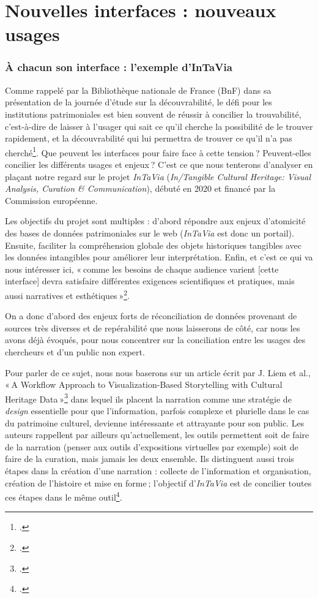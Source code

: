 \chapter{Nouvelles interfaces : nouveaux usages}

\subsection{À chacun son interface : l'exemple d'InTaVia}

Comme rappelé par la Bibliothèque nationale de France (BnF) dans sa présentation de la journée d’étude sur la découvrabilité, le défi pour les institutions patrimoniales est bien souvent de réussir à concilier la trouvabilité, c’est-à-dire de laisser à l’usager qui sait ce qu’il cherche la possibilité de le trouver rapidement, et la découvrabilité qui lui permettra de trouver ce qu’il n’a pas cherché\footcite{2023e}. Que peuvent les interfaces pour faire face à cette tension ? Peuvent-elles concilier les différents usages et enjeux ? C’est ce que nous tenterons d’analyser en plaçant notre regard sur le projet \textit{InTaVia} (\textit{In/Tangible Cultural Heritage: Visual Analysis, Curation \& Communication}), débuté en 2020 et financé par la Commission européenne.

Les objectifs du projet sont multiples : d’abord répondre aux enjeux d’atomicité des bases de données patrimoniales sur le web (\textit{InTaVia} est donc un portail). Ensuite, faciliter la compréhension globale des objets historiques tangibles avec les données intangibles pour améliorer leur interprétation. Enfin, et c’est ce qui va nous intéresser ici, « comme les besoins de chaque audience varient [cette interface] devra satisfaire différentes exigences scientifiques et pratiques, mais aussi narratives et esthétiques »\footcite{noauthor_overall_nodate}.

On a donc d’abord des enjeux forts de réconciliation de données provenant de sources très diverses et de repérabilité que nous laisserons de côté, car nous les avons déjà évoqués, pour nous concentrer sur la conciliation entre les usages des chercheurs et d’un public non expert.

Pour parler de ce sujet, nous nous baserons sur un article écrit par J. Liem et al., « A Workflow Approach to Visualization-Based Storytelling with Cultural Heritage Data »\footcite{liem_workflow_2023} dans lequel ils placent la narration comme une stratégie de \textit{design} essentielle pour que l’information, parfois complexe et plurielle dans le cas du patrimoine culturel, devienne intéressante et attrayante pour son public. Les auteurs rappellent par ailleurs qu’actuellement, les outils permettent soit de faire de la narration (penser aux outils d’expositions virtuelles par exemple) soit de faire de la curation, mais jamais les deux ensemble. Ils distinguent aussi trois étapes dans la création d’une narration : collecte de l’information et organisation, création de l’histoire et mise en forme ; l’objectif d’\textit{InTaVia} est de concilier toutes ces étapes dans le même outil\footcite[introduction]{liem_workflow_2023}.

